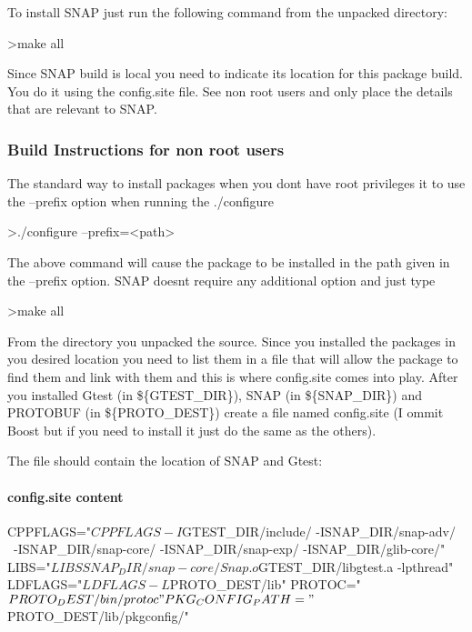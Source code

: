 To install S\+N\+A\+P just run the following command from the unpacked directory\+: \begin{DoxyVerb}>make all
\end{DoxyVerb}


Since S\+N\+A\+P build is local you need to indicate its location for this package build. You do it using the config.\+site file. See non root users and only place the details that are relevant to S\+N\+A\+P.

\subsubsection*{Build Instructions for non root users}

The standard way to install packages when you don\textquotesingle{}t have root privileges it to use the --prefix option when running the ./configure \begin{DoxyVerb}>./configure --prefix=<path>
\end{DoxyVerb}


The above command will cause the package to be installed in the path given in the --prefix option. S\+N\+A\+P doesn\textquotesingle{}t require any additional option and just type \begin{DoxyVerb}>make all 
\end{DoxyVerb}


From the directory you unpacked the source. Since you installed the packages in you desired location you need to list them in a file that will allow the package to find them and link with them and this is where config.\+site comes into play. After you installed Gtest (in \$\{G\+T\+E\+S\+T\+\_\+\+D\+I\+R\}), S\+N\+A\+P (in \$\{S\+N\+A\+P\+\_\+\+D\+I\+R\}) and P\+R\+O\+T\+O\+B\+U\+F (in \$\{P\+R\+O\+T\+O\+\_\+\+D\+E\+S\+T\}) create a file named config.\+site (I ommit Boost but if you need to install it just do the same as the others).

The file should contain the location of S\+N\+A\+P and Gtest\+:

\paragraph*{config.\+site content}

\begin{DoxyVerb}CPPFLAGS="${CPPFLAGS} -I${GTEST_DIR}/include/ -I{SNAP_DIR}/snap-adv/ \
-I{SNAP_DIR}/snap-core/ -I{SNAP_DIR}/snap-exp/ -I{SNAP_DIR}/glib-core/" 
LIBS="${LIBS} {SNAP_DIR}/snap-core/Snap.o ${GTEST_DIR}/libgtest.a -lpthread"
LDFLAGS="${LDFLAGS} -L${PROTO_DEST}/lib"
PROTOC="${PROTO_DEST}/bin/protoc"
PKG_CONFIG_PATH="${PROTO_DEST}/lib/pkgconfig/" 
\end{DoxyVerb}


